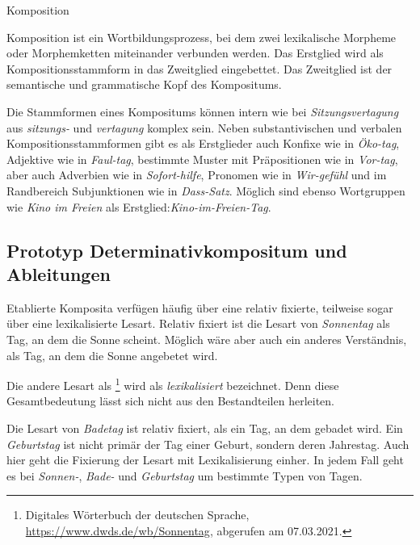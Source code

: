 \begin{Definition}{Komposition}
    
\noindent Komposition ist ein Wortbildungsprozess, bei dem zwei lexikalische Morpheme oder Morphemketten miteinander verbunden werden. Das Erstglied wird als Kompositionsstammform in das Zweitglied eingebettet. Das Zweitglied ist der semantische und grammatische Kopf des Kompositums.
\end{Definition}


Die Stammformen eines Kompositums können intern wie bei \textit{Sitzungsvertagung} aus \textit{sitzungs-} und \textit{vertagung} komplex sein. Neben substantivischen und verbalen Kompositionsstammformen gibt es als Erstglieder auch Konfixe wie in \textit{Öko-tag}, Adjektive wie in \textit{Faul-tag}, bestimmte Muster mit Präpositionen wie in \textit{Vor-tag}, aber auch Adverbien wie in \textit{Sofort-hilfe}, Pronomen wie in \textit{Wir-gefühl} und im Randbereich Subjunktionen wie in \textit{Dass-Satz}. Möglich sind ebenso Wortgruppen wie \textit{Kino im Freien} als Erstglied:\textit{Kino-im-Freien-Tag}.


\subsection{Prototyp Determinativkompositum und Ableitungen}\label{subsection:DetKomp}

Etablierte Komposita verfügen häufig über eine relativ fixierte, teilweise sogar über eine lexikalisierte Lesart. Relativ fixiert ist die Lesart von \textit{Sonnentag} als Tag, an dem die Sonne scheint. Möglich wäre aber auch ein anderes Verständnis, \zB als Tag, an dem die Sonne angebetet wird. 

Die andere Lesart als \footnote{Digitales Wörterbuch der deutschen Sprache, \url{https://www.dwds.de/wb/Sonnentag}, abgerufen am 07.03.2021.} wird als \textit{lexikalisiert} bezeichnet. Denn diese Gesamtbedeutung lässt sich nicht aus den Bestandteilen herleiten.

Die Lesart von \textit{Badetag} ist relativ fixiert, als ein Tag, an dem gebadet wird. Ein \textit{Geburtstag} ist nicht primär der Tag einer Geburt, sondern deren Jahrestag. Auch hier geht die Fixierung der Lesart mit Lexikalisierung einher. In jedem Fall geht es bei \textit{Sonnen-}, \textit{Bade-} und \textit{Geburtstag} um bestimmte Typen von Tagen.

